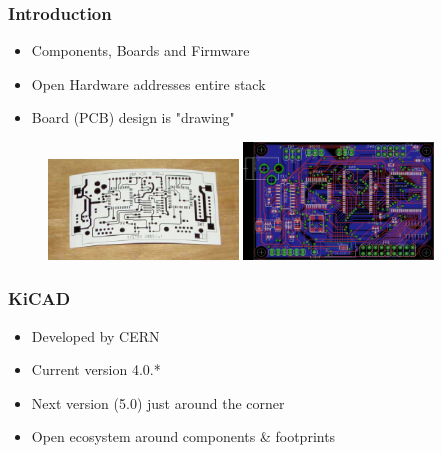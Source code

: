 \documentclass{beamer}
\begin{document}
\begin{frame}
  \frametitle{Introduction}
  \begin{itemize}
    \item Components, Boards and Firmware
    \item Open Hardware addresses entire stack
    \item Board (PCB) design is "drawing"
  \end{itemize}

  \begin{figure}[H]
    \centering
    \includegraphics[width=0.45\textwidth]{images/pcb_on_paper.jpg}
    \includegraphics[width=0.45\textwidth]{images/pcb_in_kicad.jpg}
  \end{figure}

\end{frame}


\begin{frame}
  \frametitle{KiCAD}
  \begin{itemize}
    \item Developed by CERN
    \item Current version 4.0.*
    \item Next version (5.0) just around the corner
    \item Open ecosystem around components \& footprints
  \end{itemize}
\end{frame}
\end{document}
